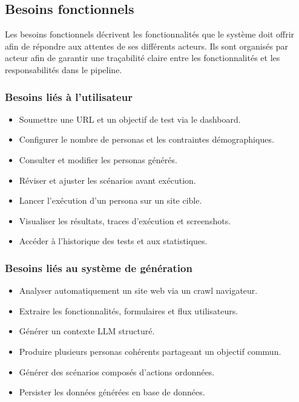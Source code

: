 
\subsection{Besoins fonctionnels}

Les besoins fonctionnels décrivent les fonctionnalités que le système doit offrir afin de répondre aux attentes de ses différents acteurs. Ils sont organisés par acteur afin de garantir une traçabilité claire entre les fonctionnalités et les responsabilités dans le pipeline.\\

\subsubsection{Besoins liés à l'utilisateur}

\begin{itemize}
\item Soumettre une URL et un objectif de test via le dashboard.\\
\item Configurer le nombre de personas et les contraintes démographiques.\\
\item Consulter et modifier les personas générés.\\
\item Réviser et ajuster les scénarios avant exécution.\\
\item Lancer l’exécution d’un persona sur un site cible.\\
\item Visualiser les résultats, traces d’exécution et screenshots.\\
\item Accéder à l’historique des tests et aux statistiques.\\
\end{itemize}

\subsubsection{Besoins liés au système de génération}

\begin{itemize}
\item Analyser automatiquement un site web via un crawl navigateur.\\
\item Extraire les fonctionnalités, formulaires et flux utilisateurs.\\
\item Générer un contexte LLM structuré.\\
\item Produire plusieurs personas cohérents partageant un objectif commun.\\
\item Générer des scénarios composés d’actions ordonnées.\\
\item Persister les données générées en base de données.\\
\end{itemize}

